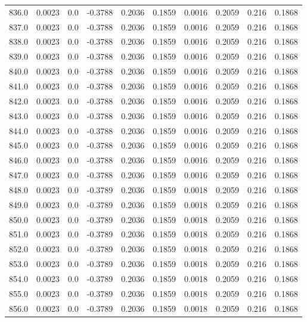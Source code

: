 \begin{longtable}{lrrrrrrrrr}
836.0 & 0.0023 & 0.0 & -0.3788 & 0.2036 & 0.1859 & 0.0016 & 0.2059 & 0.216 & 0.1868 \\
837.0 & 0.0023 & 0.0 & -0.3788 & 0.2036 & 0.1859 & 0.0016 & 0.2059 & 0.216 & 0.1868 \\
838.0 & 0.0023 & 0.0 & -0.3788 & 0.2036 & 0.1859 & 0.0016 & 0.2059 & 0.216 & 0.1868 \\
839.0 & 0.0023 & 0.0 & -0.3788 & 0.2036 & 0.1859 & 0.0016 & 0.2059 & 0.216 & 0.1868 \\
840.0 & 0.0023 & 0.0 & -0.3788 & 0.2036 & 0.1859 & 0.0016 & 0.2059 & 0.216 & 0.1868 \\
841.0 & 0.0023 & 0.0 & -0.3788 & 0.2036 & 0.1859 & 0.0016 & 0.2059 & 0.216 & 0.1868 \\
842.0 & 0.0023 & 0.0 & -0.3788 & 0.2036 & 0.1859 & 0.0016 & 0.2059 & 0.216 & 0.1868 \\
843.0 & 0.0023 & 0.0 & -0.3788 & 0.2036 & 0.1859 & 0.0016 & 0.2059 & 0.216 & 0.1868 \\
844.0 & 0.0023 & 0.0 & -0.3788 & 0.2036 & 0.1859 & 0.0016 & 0.2059 & 0.216 & 0.1868 \\
845.0 & 0.0023 & 0.0 & -0.3788 & 0.2036 & 0.1859 & 0.0016 & 0.2059 & 0.216 & 0.1868 \\
846.0 & 0.0023 & 0.0 & -0.3788 & 0.2036 & 0.1859 & 0.0016 & 0.2059 & 0.216 & 0.1868 \\
847.0 & 0.0023 & 0.0 & -0.3788 & 0.2036 & 0.1859 & 0.0016 & 0.2059 & 0.216 & 0.1868 \\
848.0 & 0.0023 & 0.0 & -0.3789 & 0.2036 & 0.1859 & 0.0018 & 0.2059 & 0.216 & 0.1868 \\
849.0 & 0.0023 & 0.0 & -0.3789 & 0.2036 & 0.1859 & 0.0018 & 0.2059 & 0.216 & 0.1868 \\
850.0 & 0.0023 & 0.0 & -0.3789 & 0.2036 & 0.1859 & 0.0018 & 0.2059 & 0.216 & 0.1868 \\
851.0 & 0.0023 & 0.0 & -0.3789 & 0.2036 & 0.1859 & 0.0018 & 0.2059 & 0.216 & 0.1868 \\
852.0 & 0.0023 & 0.0 & -0.3789 & 0.2036 & 0.1859 & 0.0018 & 0.2059 & 0.216 & 0.1868 \\
853.0 & 0.0023 & 0.0 & -0.3789 & 0.2036 & 0.1859 & 0.0018 & 0.2059 & 0.216 & 0.1868 \\
854.0 & 0.0023 & 0.0 & -0.3789 & 0.2036 & 0.1859 & 0.0018 & 0.2059 & 0.216 & 0.1868 \\
855.0 & 0.0023 & 0.0 & -0.3789 & 0.2036 & 0.1859 & 0.0018 & 0.2059 & 0.216 & 0.1868 \\
856.0 & 0.0023 & 0.0 & -0.3789 & 0.2036 & 0.1859 & 0.0018 & 0.2059 & 0.216 & 0.1868 \\

\end{longtable}
